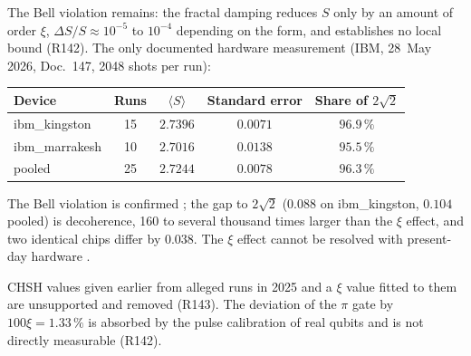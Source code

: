 The Bell violation remains: the fractal damping reduces $S$ only by an amount of order $\xi$,
$\Delta S/S\approx10^{-5}$ to $10^{-4}$ depending on the form, and establishes no local bound
(R142). The only documented hardware measurement (IBM, 28~May 2026, Doc.~147, 2048 shots per
run):
\begin{center}
\small
\begin{tabular}{@{}lcccc@{}}
\toprule
\textbf{Device} & \textbf{Runs} & $\langle S\rangle$ & \textbf{Standard error} & \textbf{Share of }$2\sqrt2$ \\
\midrule
ibm\_kingston & 15 & $2.7396$ & $0.0071$ & $96.9\,\%$ \\
ibm\_marrakesh & 10 & $2.7016$ & $0.0138$ & $95.5\,\%$ \\
pooled & 25 & $2.7244$ & $0.0078$ & $96.3\,\%$ \\
\bottomrule
\end{tabular}
\end{center}
\noindent The Bell violation is confirmed \KM; the gap to $2\sqrt2$ ($0.088$ on ibm\_kingston,
$0.104$ pooled) is decoherence, 160 to several thousand times larger than the $\xi$ effect, and
two identical chips differ by $0.038$. The $\xi$ effect cannot be resolved with present-day
hardware \SM.

CHSH values given earlier from alleged runs in 2025 and a $\xi$ value fitted to them
are unsupported and removed (R143). The deviation of the $\pi$ gate by $100\xi=1.33\,\%$ is
absorbed by the pulse calibration of real qubits and is not directly measurable (R142).

